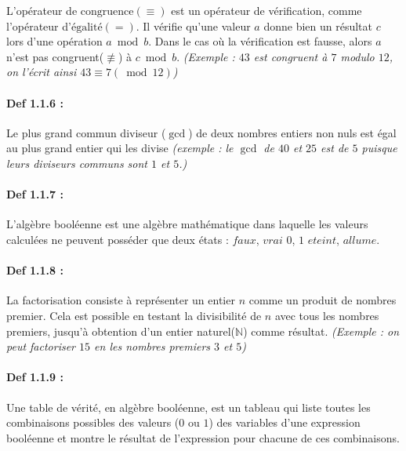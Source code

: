 \documentclass{article}
\begin{document}
L'opérateur de \(\text{congruence}(\equiv)\) est un opérateur de
vérification, comme l'opérateur d'\(\text{égalité}(=)\). Il vérifie
qu'une valeur \(a\) donne bien un résultat \(c\) lors d'une opération
\(a \bmod b\). Dans le cas où la vérification est fausse, alors \(a\)
n'est pas congruent(\(\not\equiv\)) à \(c \bmod b\). \textit{(Exemple : $43$ est congruent à $7$ modulo $12$, on l'écrit ainsi $43 \equiv 7 (\bmod 12)$)}

\paragraph{Def 1.1.6 :}\label{def-1.1.6}

Le plus grand commun diviseur ($\gcd$) de deux nombres entiers non nuls
est égal au plus grand entier qui les divise \textit{(exemple : le $\gcd$
	de \(40\) et \(25\) est de \(5\) puisque leurs diviseurs communs sont
	\(1\) et \(5\).)}

\paragraph{Def 1.1.7 :}\label{def-1.1.7}

L'algèbre booléenne est une algèbre mathématique dans laquelle les valeurs calculées
ne peuvent posséder que deux états : \(faux\), \(vrai\) \textbar{}
\(0\), \(1\) \textbar{} \(eteint\), \(allume\).

\paragraph{Def 1.1.8 :}\label{def-1.1.8}

La factorisation consiste à représenter un entier \(n\) comme un produit
de nombres premier. Cela est possible en testant la divisibilité de
\(n\) avec tous les nombres premiers, jusqu'à obtention d'un entier naturel($\mathbb{N}$) comme résultat. \textit{(Exemple : on peut factoriser $15$ en les nombres premiers $3$ et $5$)}

\paragraph{Def 1.1.9 :}\label{def-1.1.9}

Une table de vérité, en algèbre booléenne, est un tableau qui liste
toutes les combinaisons possibles des valeurs (\(0\) ou \(1\)) des
variables d'une expression booléenne et montre le résultat de
l'expression pour chacune de ces combinaisons.
\end{document}
